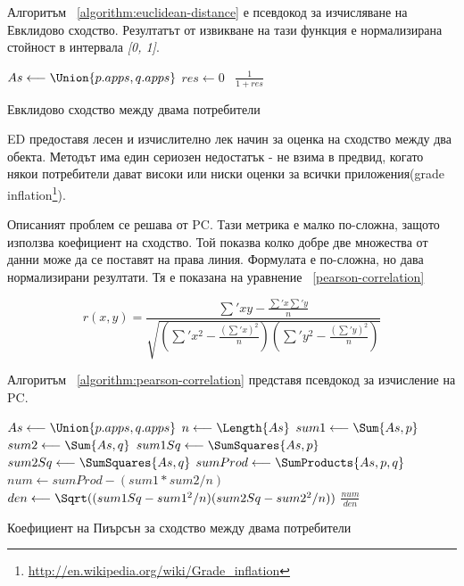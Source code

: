 		Алгоритъм ~\ref{algorithm:euclidean-distance} е псевдокод за изчисляване на Евклидово сходство. Резултатът от извикване на тази функция е нормализирана стойност в интервала \emph{[0, 1]}.
		
		\vspace{2em}		
		
		\begin{algorithm}[H]
			\label{algorithm:euclidean-distance}
			$As \longleftarrow \Union{p.apps, q.apps} $\;
			$res \longleftarrow 0$\;
			\
			\Return $\frac{1}{1 + res}$\;
			\caption{Евклидово сходство между двама потребители}
		\end{algorithm}
		
		\vspace{2em}
		
		\ac{ED} предоставя лесен и изчислително лек начин за оценка на сходство между два обекта. Методът има един сериозен недостатък - не взима в предвид, когато някои потребители дават високи или ниски оценки за всички приложения(grade inflation\footnote{\url{http://en.wikipedia.org/wiki/Grade_inflation}}).
		
		Описаният проблем се решава от \ac{PC}. Тази метрика е малко по-сложна, защото използва коефициент на сходство. Той показва колко добре две множества от данни може да се поставят на права линия. Формулата е по-сложна, но дава нормализирани резултати. Тя е показана на уравнение ~\eqref{pearson-correlation}
		
		\begin{equation}\label{pearson-correlation}
			r(x, y) = \frac{\sum\nolimits'xy - \frac{\sum\nolimits'x\sum\nolimits'y}{n}}
			{\sqrt{(\sum\nolimits'x^2 - \frac{(\sum\nolimits'x)^2}{n})(\sum\nolimits'y^2 - \frac{(\sum\nolimits'y)^2}{n})}}
		\end{equation}
		
		Алгоритъм ~\ref{algorithm:pearson-correlation} представя псевдокод за изчисление на \ac{PC}.
		
		\vspace{2em}

		\begin{algorithm}[H]
			\label{algorithm:pearson-correlation}
			$As \longleftarrow \Union{p.apps, q.apps} $\;
			$n \longleftarrow \Length{As} $\;
			$sum1 \longleftarrow \Sum{As, p} $\;
			$sum2 \longleftarrow \Sum{As, q} $\;
			$sum1Sq \longleftarrow \SumSquares{As, p} $\;
			$sum2Sq \longleftarrow \SumSquares{As, q} $\;
			$sumProd \longleftarrow \SumProducts{As, p, q} $\;
			$num \longleftarrow sumProd - (sum1 * sum2 / n) $\;
			$den \longleftarrow \Sqrt((sum1Sq - sum1^2/n)(sum2Sq - sum2^2/n)) $\;
			\Return $\frac{num}{den}$\;
			\caption{Коефициент на Пиърсън за сходство между двама потребители}
		\end{algorithm}

